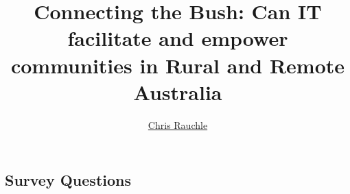 \documentclass[phd, titlesmallcaps, examinerscopy, copyrightpage, foronline]{mqthesis}
\begin{document}
\frontmatter

\title{Connecting the Bush: Can IT facilitate and empower communities in Rural and Remote Australia}


  \author{\href{mailto:chris.rauchle@gmail.com}{Chris Rauchle}}




\titlepage

%
%


\tableofcontents
\listoffigures
\listoftables

\printglossary

\printglossary[type=\acronymtype]



\mainmatter

%










\begin{appendices}
\chapter{Survey Questions}




\end{appendices}

\backmatter

%


%
\printbibliography

 
\printindex
\end{document}
